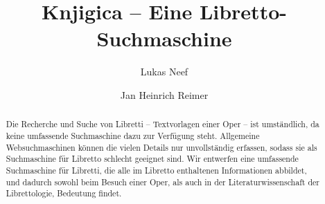 

\title{Knjigica -- Eine Libretto-Suchmaschine}


\author{Lukas Neef}

\author{Jan Heinrich Reimer}

\usepackage[math]{blindtext} %
\usepackage{todo} %



\begin{abstract}
    Die Recherche und Suche von Libretti
    -- Textvorlagen einer Oper --
    ist umständlich, da keine umfassende Suchmaschine
    dazu zur Verfügung steht.
    Allgemeine Websuchmaschinen können die vielen Details
    nur unvollständig erfassen,
    sodass sie als Suchmaschine für Libretto schlecht geeignet sind.
    Wir entwerfen eine umfassende Suchmaschine für Libretti,
    die alle im Libretto enthaltenen Informationen abbildet,
    und dadurch sowohl beim Besuch einer Oper,
    als auch in der Literaturwissenschaft der Librettologie,
    Bedeutung findet.
\end{abstract}

\maketitle



\printbibliography

\pagebreak
\todos %


